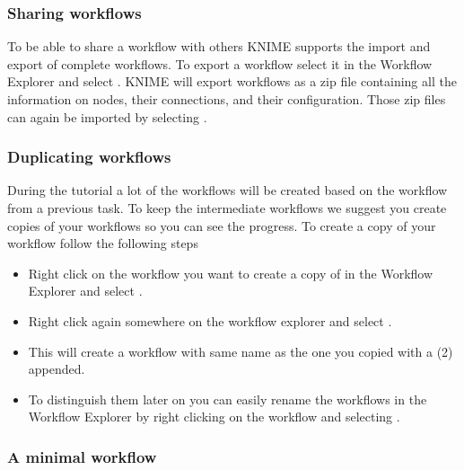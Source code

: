 \subsubsection{Sharing workflows}
\label{sec:sharing_workflows}

To be able to share a workflow with others KNIME supports the import and export of complete workflows.
To export a workflow select it in the Workflow Explorer and select .
KNIME will export workflows as a zip file containing all the information on nodes, their connections, and their configuration.
Those zip files can again be imported by selecting .


\subsubsection{Duplicating workflows}
\label{sec:duplicate-wf}

During the tutorial a lot of the workflows will be created based on the workflow from a previous task.
To keep the intermediate workflows we suggest you create copies of your workflows so you can see the progress.
To create a copy of your workflow follow the following steps

\begin{itemize}
\item
Right click on the workflow you want to create a copy of in the Workflow Explorer and select .
\item
Right click again somewhere on the workflow explorer and select .
\item
This will create a workflow with same name as the one you copied with a (2) appended.
\item
To distinguish them later on you can easily rename the workflows in the Workflow Explorer by right clicking on the workflow and selecting . 
\end{itemize}

\subsubsection{A minimal workflow}
\label{Minimal_Workflow}

